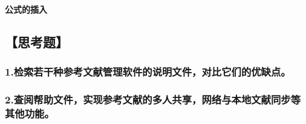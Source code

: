 \documentclass[12pt,a4paper]{article}
\begin{document}
\newpage
\paragraph*{公式的插入}


\subsection*{【思考题】}
	\subsubsection*{1.检索若干种参考文献管理软件的说明文件，对比它们的优缺点。}
	\subsubsection*{2.查阅帮助文件，实现参考文献的多人共享，网络与本地文献同步等其他功能。}

\newpage




	
\end{document}
